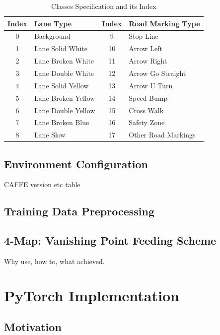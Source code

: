 \begin{spacing}{1.5}
\begin{table}[ht]
\centering
\caption{Classes Specification and its Index}
\label{tab:classes}
\begin{tabular}{clcl}
\toprule
Index & Lane Type          & Index & Road Marking Type   \\ \midrule
0     & Background         & 9     & Stop Line           \\
1     & Lane Solid White   & 10    & Arrow Left          \\
2     & Lane Broken White  & 11    & Arrow Right         \\
3     & Lane Double White  & 12    & Arrow Go Straight   \\
4     & Lane Solid Yellow  & 13    & Arrow U Turn        \\
5     & Lane Broken Yellow & 14    & Speed Bump          \\
6     & Lane Double Yellow & 15    & Cross Walk          \\
7     & Lane Broken Blue   & 16    & Safety Zone         \\
8     & Lane Slow          & 17    & Other Road Markings \\ \bottomrule
\end{tabular}
\end{table}%

\subsection{Environment Configuration}

CAFFE version etc table

\subsection{Training Data Preprocessing}



\subsection{4-Map: Vanishing Point Feeding Scheme}
\label{subsec:fourmap}

Why use, how to, what achieved.

\section{PyTorch Implementation}
\label{sec:MD_PyTorch}

\subsection{Motivation}


\end{spacing}
